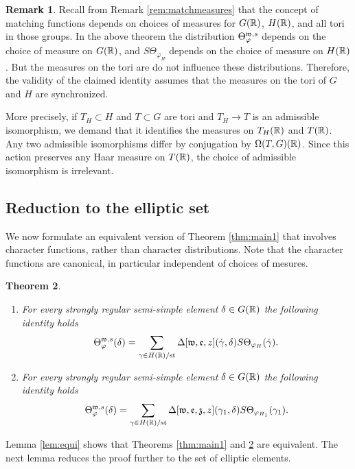 \documentclass{article}
\newtheorem{thm}{Theorem}[subsection]
\theoremstyle{definition}
\newtheorem{rem}[thm]{Remark}
\numberwithin{equation}{section}
\renewcommand{\-}{\hyp{}}
\begin{document}
\begin{rem} \label{rem:measures}
	Recall from Remark \ref{rem:matchmeasures} that the concept of matching functions depends on choices of measures for $G(\mathbb{R})$, $H(\mathbb{R})$, and all tori in those groups. In the above theorem the distribution $\Theta^{\mathfrak{w},s}_\varphi$ depends on the choice of measure on $G(\mathbb{R})$, and $S\Theta_{\varphi_H}$ depends on the choice of measure on $H(\mathbb{R})$. But the measures on the tori are do not influence these distributions. Therefore, the validity of the claimed identity assumes that the measures on the tori of $G$ and $H$ are synchronized.

	More precisely, if $T_H \subset H$ and $T \subset G$ are tori and $T_H \to T$ is an admissible isomorphism, we demand that it identifies the measures  on $T_H(\mathbb{R})$ and $T(\mathbb{R})$. Any two admissible isomorphisms differ by conjugation by $\Omega(T,G)(\mathbb{R})$. Since this action preserves any Haar measure on $T(\mathbb{R})$, the choice of admissible isomorphism is irrelevant.
\end{rem}

\subsection{Reduction to the elliptic set}

We now formulate an equivalent version of Theorem \ref{thm:main1} that involves character functions, rather than character distributions. Note that the character functions are canonical, in particular independent of choices of mesures.

\begin{thm} \label{thm:main2}
\begin{enumerate}
	\item For every strongly regular semi-simple element $\delta \in G(\mathbb{R})$ the following identity holds
	\[ \Theta_\varphi^{\mathfrak{w},s}(\delta) = \sum_{\gamma \in H(\mathbb{R})/\textrm{st}} \Delta[\mathfrak{w},\mathfrak{e},z](\dot\gamma,\delta)S\Theta_{\varphi_H}(\dot\gamma). \]
	\item For every strongly regular semi-simple element $\delta \in G(\mathbb{R})$ the following identity holds
	\[ \Theta_\varphi^{\mathfrak{w},s}(\delta) = \sum_{\gamma \in H(\mathbb{R})/\textrm{st}} \Delta[\mathfrak{w},\mathfrak{e},\mathfrak{z},z](\gamma_1,\delta)S\Theta_{\varphi_{H_1}}(\gamma_1). \]
\end{enumerate}
\end{thm}

Lemma \ref{lem:equi} shows that Theorems \ref{thm:main1} and \ref{thm:main2} are equivalent. The next lemma reduces the proof further to the set of elliptic elements.
\end{document}
